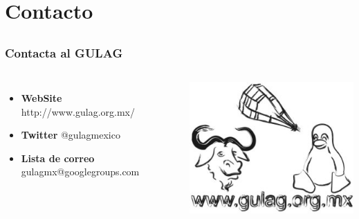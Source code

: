 %
%

\section{Contacto}

\subsection{}
\begin{frame}
    \frametitle{Contacta al GULAG}
    \begin{columns}
            \begin{itemize}
                \item \textbf{WebSite} http://www.gulag.org.mx/
                \indent\par
                \item \textbf{Twitter} @gulagmexico
                \indent\par
                \item \textbf{Lista de correo} gulagmx@googlegroups.com
            \end{itemize}
            \includegraphics[width=\textwidth]{LogotipoGULAG.jpg}
    \end{columns}
\end{frame}

